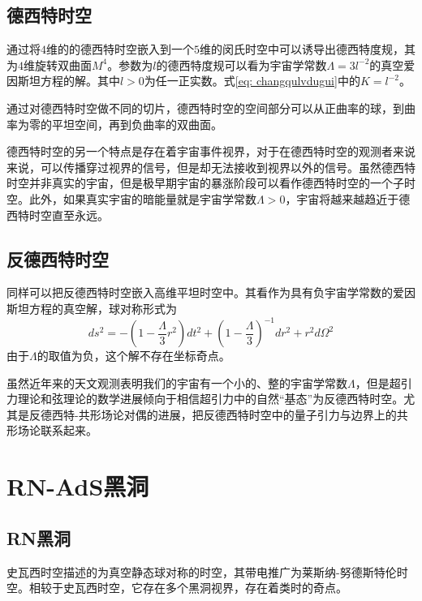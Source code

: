\subsection{德西特时空}
通过将$4$维的的德西特时空嵌入到一个$5$维的闵氏时空中可以诱导出德西特度规，其为$4$维旋转双曲面$M^4$。参数为$l$的德西特度规可以看为宇宙学常数$\Lambda=3l^{-2}$的真空爱因斯坦方程的解。其中$l>0$为任一正实数。式\eqref{eq: changqulvdugui}中的$K=l^{-2}$。

通过对德西特时空做不同的切片，德西特时空的空间部分可以从正曲率的球，到曲率为零的平坦空间，再到负曲率的双曲面。

德西特时空的另一个特点是存在着宇宙事件视界，对于在德西特时空的观测者来说来说，可以传播穿过视界的信号，但是却无法接收到视界以外的信号\citep{witten2001quantum}。虽然德西特时空并非真实的宇宙，但是极早期宇宙的暴涨阶段可以看作德西特时空的一个子时空。此外，如果真实宇宙的暗能量就是宇宙学常数$\Lambda>0$，宇宙将越来越趋近于德西特时空直至永远\citep{梁灿彬2006微分几何入门与广义相对论}。
\subsection{反德西特时空}
同样可以把反德西特时空嵌入高维平坦时空中。其看作为具有负宇宙学常数的爱因斯坦方程的真空解，球对称形式为
\begin{equation}
    ds^2=-\left(1-\frac{\Lambda}{3}r^2\right)dt^2+\left(1-\frac{\Lambda}{3}\right)^{-1}dr^2+r^2d\Omega^2
\end{equation}
由于$\Lambda$的取值为负，这个解不存在坐标奇点。

虽然近年来的天文观测表明我们的宇宙有一个小的、整的宇宙学常数$\Lambda$\citep{梁灿彬2006微分几何入门与广义相对论}，但是超引力理论和弦理论的数学进展倾向于相信超引力中的自然“基态”为反德西特时空。尤其是反德西特-共形场论对偶的进展，把反德西特时空中的量子引力与边界上的共形场论联系起来\citep{maldacena1999large,aharony2000large}。
\section{RN-AdS黑洞}
\subsection{RN黑洞}
史瓦西时空描述的为真空静态球对称的时空，其带电推广为莱斯纳-努德斯特伦时空。相较于史瓦西时空，它存在多个黑洞视界，存在着类时的奇点。

